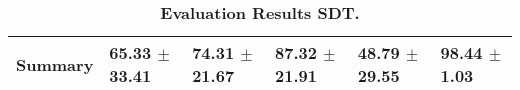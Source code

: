 \begin{table}[htb]
{\begin{tabular}{llllll}
\midrule
\textbf{Summary                                  } &                  \phantom{0}65.33 $\pm$ 33.41 &                      \phantom{0}74.31 $\pm$ 21.67 &                  \phantom{0}87.32 $\pm$ 21.91 &            \phantom{0}48.79 $\pm$ 29.55 &  \phantom{0}98.44 $\pm$ \phantom{0}1.03 \\
\bottomrule
\end{tabular}%
}
\caption{\textbf{Evaluation Results SDT.}}
\label{tab:eval-results}
\end{table}
\newpage 
